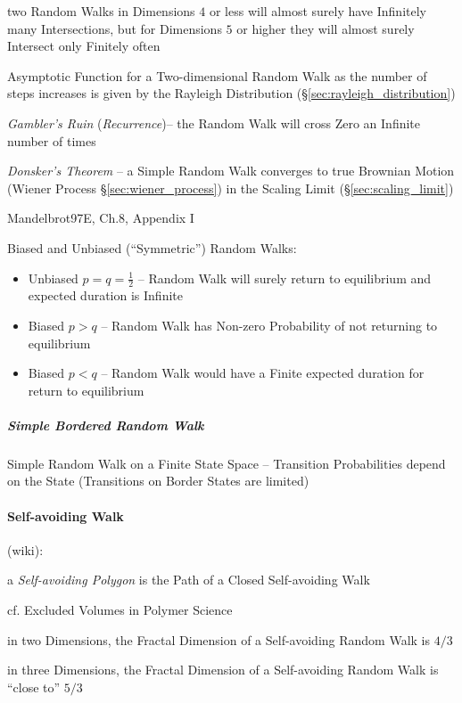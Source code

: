 two Random Walks in Dimensions $4$ or less will almost surely have Infinitely
many Intersections, but for Dimensions $5$ or higher they will almost surely
Intersect only Finitely often

Asymptotic Function for a Two-dimensional Random Walk as the number of steps
increases is given by the Rayleigh Distribution
(\S\ref{sec:rayleigh_distribution})

\emph{Gambler's Ruin} (\emph{Recurrence})-- the Random Walk will cross Zero an
Infinite number of times

\emph{Donsker's Theorem} -- a Simple Random Walk converges to true Brownian
Motion (Wiener Process \S\ref{sec:wiener_process}) in the Scaling Limit
(\S\ref{sec:scaling_limit})

\asterism

Mandelbrot97E, Ch.8, Appendix I

Biased and Unbiased (``Symmetric'') Random Walks:
\begin{itemize}
  \item Unbiased $p = q = \frac{1}{2}$ -- Random Walk will surely return to
    equilibrium and expected duration is Infinite
  \item Biased $p > q$ -- Random Walk has Non-zero Probability of not returning
    to equilibrium
  \item Biased $p < q$ -- Random Walk would have a Finite expected duration for
    return to equilibrium
\end{itemize}



\subparagraph{Simple Bordered Random Walk}\label{sec:simple_bordered_walk}\hfill

Simple Random Walk on a Finite State Space -- Transition Probabilities depend on
the State (Transitions on Border States are limited)



\paragraph{Self-avoiding Walk}\label{sec:selfavoiding_walk}\hfill

(wiki):

a \emph{Self-avoiding Polygon} is the Path of a Closed Self-avoiding Walk

cf. Excluded Volumes in Polymer Science

in two Dimensions, the Fractal Dimension of a Self-avoiding Random Walk is $4/3$

in three Dimensions, the Fractal Dimension of a Self-avoiding Random Walk is
``close to'' $5/3$

